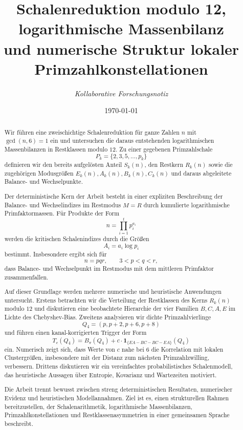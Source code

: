 \documentclass[11pt,a4paper]{article}
\title{\textbf{Schalenreduktion modulo 12, logarithmische Massenbilanz\\
		und numerische Struktur lokaler Primzahlkonstellationen}}
\author{\textit{Kollaborative Forschungsnotiz}}
\date{\today}
\theoremstyle{plain}
\theoremstyle{definition}
\theoremstyle{remark}
\newcommand{\1}{\mathbf{1}}
\begin{document}
	\maketitle
	
	\begin{abstract}
		Wir führen eine zweischichtige Schalenreduktion für ganze Zahlen \(n\) mit \(\gcd(n,6)=1\) ein und untersuchen die daraus entstehenden logarithmischen Massenbilanzen in Restklassen modulo \(12\). Zu einer gegebenen Primzahlschale
		\[
		P_k=\{2,3,5,\dots,p_k\}
		\]
		definieren wir den bereits aufgelösten Anteil \(S_k(n)\), den Restkern \(R_k(n)\) sowie die zugehörigen Modusgrößen \(E_k(n),A_k(n),B_k(n),C_k(n)\) und daraus abgeleitete Balance- und Wechselpunkte.
		
		Der deterministische Kern der Arbeit besteht in einer expliziten Beschreibung der Balance- und Wechselindizes im Restmodus \(M=R\) durch kumulierte logarithmische Primfaktormassen. Für Produkte der Form
		\[
		n=\prod_{i=1}^t p_i^{a_i}
		\]
		werden die kritischen Schalenindizes durch die Größen
		\[
		A_i=a_i\log p_i
		\]
		bestimmt. Insbesondere ergibt sich für
		\[
		n=pqr,\qquad 3<p<q<r,
		\]
		dass Balance- und Wechselpunkt im Restmodus mit dem mittleren Primfaktor zusammenfallen.
		
		Auf dieser Grundlage werden mehrere numerische und heuristische Anwendungen untersucht. Erstens betrachten wir die Verteilung der Restklassen des Kerns \(R_k(n)\) modulo \(12\) und diskutieren eine beobachtete Hierarchie der vier Familien \(B,C,A,E\) im Lichte des Chebyshev-Bias. Zweitens analysieren wir dichte Primzahlvierlinge
		\[
		Q_4=(p,p+2,p+6,p+8)
		\]
		und führen einen kanal-korrigierten Trigger der Form
		\[
		T_c(Q_4)=B_\pi(Q_4)+c\cdot \mathbf{1}_{\{EA-BC-BC-EA\}}(Q_4)
		\]
		ein. Numerisch zeigt sich, dass Werte von \(c\) nahe bei \(6\) die Korrelation mit lokalen Clustergrößen, insbesondere mit der Distanz zum nächsten Primzahlzwilling, verbessern. Drittens diskutieren wir ein vereinfachtes probabilistisches Schalenmodell, das heuristische Aussagen über Entropie, Kovarianz und Wartezeiten motiviert.
		
		Die Arbeit trennt bewusst zwischen streng deterministischen Resultaten, numerischer Evidenz und heuristischen Modellannahmen. Ziel ist es, einen strukturellen Rahmen bereitzustellen, der Schalenarithmetik, logarithmische Massenbilanzen, Primzahlkonstellationen und Restklassenasymmetrien in einer gemeinsamen Sprache beschreibt.
	\end{abstract}
	
\end{document}
